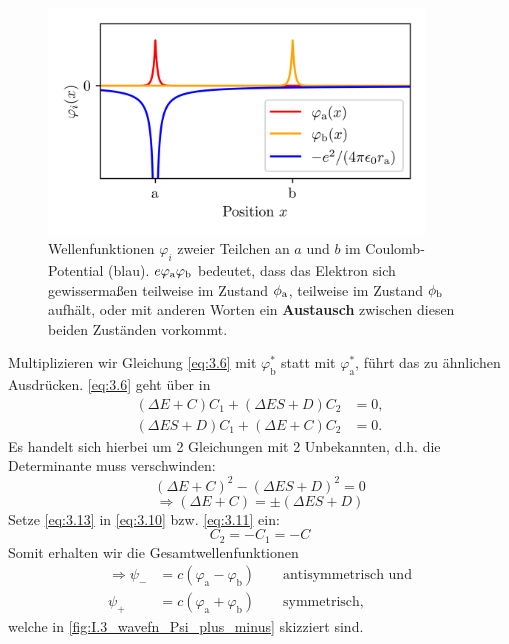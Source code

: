     \begin{figure}[H]
        \centering
        \includegraphics[width=10cm]{figures/vl04/wavefn_exchange_integral.png}   
        \caption{Wellenfunktionen $\varphi_i$ zweier Teilchen an $a$ und $b$ im Coulomb-Potential (blau). $e\varphi_\text a\varphi_\text b$ bedeutet, dass das Elektron sich gewissermaßen teilweise im Zustand $\phi_\text a$, teilweise im Zustand $\phi_\text b$ aufhält, oder mit anderen Worten ein \textbf{Austausch} zwischen diesen beiden Zuständen vorkommt.}     
        \label{fig:I.3_wavefn_exchange_integral}
    \end{figure}

    Multiplizieren wir Gleichung \eqref{eq:3.6} mit $ \varphi^{*}_\text{b}$ statt mit $ \varphi_\text{a}^{*}$, führt das zu ähnlichen Ausdrücken. 
    \eqref{eq:3.6} geht über in
    \begin{align}
        \label{eq:3.10}
        \left( \Delta E + C \right) C_1 + \left( \Delta E S + D \right) C_2 &= 0, \\
        \label{eq:3.11}
        \left( \Delta E S + D \right) C_1 + \left( \Delta E + C \right) C_2 &= 0.
    \end{align}
    Es handelt sich hierbei um 2 Gleichungen mit 2 Unbekannten, d.h. die Determinante muss verschwinden:
    \begin{equation}
        \label{eq:3.12}
        \left( \Delta E + C \right) ^2 - \left( \Delta ES + D \right) ^2 = 0
    \end{equation}
    \begin{equation}
        \label{eq:3.13}
        \Rightarrow \left( \Delta E + C  \right) = \pm \left( \Delta ES + D \right) 
    \end{equation}
    Setze \eqref{eq:3.13} in \eqref{eq:3.10} bzw. \eqref{eq:3.11} ein:
    \begin{equation}
        \label{eq:3.14}
        C_2 = - C_1 = -C
    \end{equation}
    Somit erhalten wir die Gesamtwellenfunktionen
    \begin{align}
        \label{eq:3.15}
        \Rightarrow \psi_{-} &= c\left( \varphi_\mathrm{a} - \varphi_\mathrm{b} \right) \qquad\text{antisymmetrisch und} \\
        \label{eq:3.16}
        \psi_{+} &= c\left( \varphi_\mathrm{a} + \varphi_\mathrm{b} \right) \qquad\text{symmetrisch,}
    \end{align}
    welche in \autoref{fig:I.3_wavefn_Psi_plus_minus} skizziert sind.

